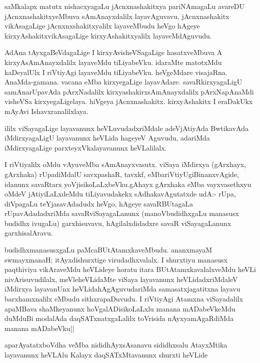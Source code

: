 \begin{artha}
saMkalapx matutx nishacxyagaLu jAcnxnashakitxya pariNAmagaLu avareDU
jAcnxnashakitxyeMbuva sAmAnayxdalilx layavAguvavu, jAcnxnashakitx
vikAsagaLige jAcnxnxshakitxyalilx layaveMbudu heVgo hAgeye
kirxyAshakitxvikAsagaLige kirxyAshakitxyalilx layaveMdAguvudu.
\end{artha}

\begin{artha}
AdAna tAyxgaBeVdagaLige I kirxyAvisheVSagaLige hasatxveMbuva A
kirxyAsAmAnayxdalilx layaveMdu tiLiyabeVku. idaraMte matotxMdu
kaDeyalUlx I riVtiyAgi layaveMdu tiLiyabeVku. heVgeMdare
visajaRna. AnaMda-gamana. vacana eMba kirxyegaLige
layavAdare. savaRkirxyagaLigU samAnarUpavAda pArxNadalilx
kirxyashakirxsAmAnayxdalilx pArxNapAnaMdi visheVSa
kirxyegaLigelaya. hiVgeya jAcnxnashakitx. kirxyAshakitx I eraDakUkx
mAyAvi Ishavxranalilxlaya.

ililx viSayagaLige layavanunx heVLuvudadxriMdale adeVjAtiyAda
BwtikavAda iMdirxyagaLigU layavanunx heVLida hageyeV Aguvudu, adariMda
iMdirxyagaLige parxteyxVkalayavanunx heVLalilalx.
\end{artha}

\begin{artha}

I riVtiyalilx oMdu vAyuveMba sAmAnayxvasutx. viSaya iMdirxya
(gArxhayx, gArxhaka)  rUpadiMdalU savxpashaR, tavxkf,
eMbariVtiyUgiBinanxvAgide, idanunx savaRtarx
yoVjisikoLaLxbeVku.gAhayx gArxhaka eMba vayxvasethxyu oMdeV
jAtiyiLaLxdeMdu tiLiyavudakekx sAdhakavAgutatxde udA:- rUpa, diVpagaLu
teYjasavAdadudx heVgo, hAgeye savaRBUtagaLa rUpavAdadadxriMda
savaRviSayagaLanunx (manoVbudidhxgaLu manasusx budidhx ivugaLu)
garxhisuvavu, hAgilalxdidadxre savaR viSayagaLanunx garxhisalAravu.

budidhxmanasusxgaLu paMcaBUtAtamxkaveMbudu. ananxmayaM swmayxmanaH;
itAyxdishurxtige virudadhxvalalx. I shurxtiyu manasusx paqthiviya
vikAraveMdu heVLideye horatu itara BUtAtamxkavalalxveMdu heVLi
nivArisuvudilalx, meVleheVLidaMte viSaya layavanunx heVLidadxriMdaleV
iMdirxya layavanUnx heVLidahAgAguvudariMda samasatxjagatitxna layavu
barxhamxnalilx eMbudu sithxrapaDuvudu. I riVtiyAgi Atamxna
viSayadalilx apaMBava shaMkeyanunx hoVgalADisikoLaLxlu manana
mADabeVkeMdu duMduBi modalAda daqSATxnatxgaLalilx toVrisida
nAyxyamAgaRdiMda manana mADabeVku||
\end{artha}

\begin{artha}
aparAyatatxboVdha veMba nididhAyxsAsanavu sididhxsalu AtayxMtika
layavanunx heVLAlu Kalayx daqSATxMtavanunx shurxti heVLide
\end{artha}

